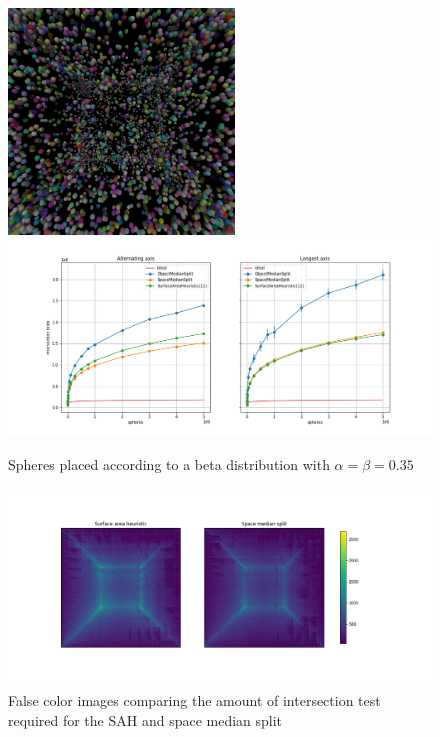 \documentclass{article}
\begin{document}
\begin{figure}[!htb]
    \centering
    \includegraphics[width=6cm]{renders/equal_spheres_beta_corners.png}
    \includegraphics[width=12cm]{plots/splitting_heuristics_equal_spheres_beta_corners.png}
    \caption{Spheres placed according to a beta distribution with $\alpha = \beta = 0.35$}
    \label{fig:splitting_heuristics_equal_spheres_beta_corners}
\end{figure}

\begin{figure}[!htb]
    \centering
    \includegraphics[width=12cm]{plots/splitting_heuristics_equal_spheres_beta_corners_false_color.png}
    \caption{False color images comparing the amount of intersection test required for the SAH and space median split}
    \label{fig:splitting_heuristics_equal_spheres_beta_corners_false_color}
\end{figure}
\end{document}
